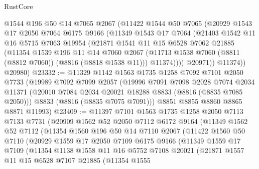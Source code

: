 \begin{lexlean}{RustCore}
\begin{coremodule}
          @1544
          @196
          @50
          @14
          @7065
          @2067
          (@11422
            @1544
            @50
            @7065
            (@20929
              @1543
              @17
              @2050
              @7064
              @6175
              @9166
              (@11349
                @1543
                @17
                @7064
                (@21403
                  @1542
                  @11
                  @16
                  @5715
                  @7063
                  @19954
                  (@21871
                    @1541
                    @11
                    @15
                    @6528
                    @7062
                    @21885
                    (@11354
                      @1539
                      @196
                      @11
                      @14
                      @7060
                      @2067
                      (@11713 @1538 @7060 (@8811 (@8812 @7060)) (@8816 (@8818 @1538 @11)))
                      @11374))))
              @20971))
          @11374))
      @20980)
@23332 := @11329
    @1142
    @1563
    @1735
    @1258
    @7092
    @7101
    @2050
    @7733
    (@19989
      @7092
      @7099
      @2057
      (@19996
        @7091
        @7098
        @2028
        @7074
        @2034
        @11371
        (@20010 @7084 @2034 @20021 @18288 @8833 (@8816 (@8835 @7085 @2050)))
        @8833
        (@8816 (@8835 @7075 @7091)))
      @8851
      @8855
      @8860
      @8865
      @8871
      @11993)
@23409 := @11397
    @7101
    @1563
    @1735
    @1258
    @2050
    @7113
    @7133
    @7731
    (@20909
      @1562
      @52
      @2050
      @7112
      @6172
      @9164
      (@11349
        @1562
        @52
        @7112
        (@11354
          @1560
          @196
          @50
          @14
          @7110
          @2067
          (@11422
            @1560
            @50
            @7110
            (@20929
              @1559
              @17
              @2050
              @7109
              @6175
              @9166
              (@11349
                @1559
                @17
                @7109
                (@11354
                  @1138
                  @1558
                  @11
                  @16
                  @5752
                  @7108
                  @20021
                  (@21871
                    @1557
                    @11
                    @15
                    @6528
                    @7107
                    @21885
                    (@11354
                      @1555

\end{coremodule}
\end{lexlean}
